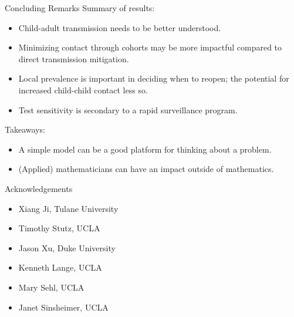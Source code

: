 \documentclass[8pt]{beamer}
\begin{document}
\begin{frame}{Concluding Remarks}
Summary of results:
\begin{itemize}
    \item Child-adult transmission needs to be better understood.
    \item Minimizing contact through cohorts may be more impactful compared to direct transmission mitigation.
    \item Local prevalence is important in deciding when to reopen; the potential for increased child-child contact less so.
    \item Test sensitivity is secondary to a rapid surveillance program.
\end{itemize}

Takeaways:
\begin{itemize}
    \item A simple model can be a good platform for thinking about a problem.
    \item (Applied) mathematicians can have an impact outside of mathematics.
\end{itemize}
\end{frame}

\begin{frame}{Acknowledgements}
\begin{itemize}
    \item Xiang Ji, Tulane University
    \item Timothy Stutz, UCLA
    \item Jason Xu, Duke University
    \item Kenneth Lange, UCLA
    \item Mary Sehl, UCLA
    \item Janet Sinsheimer, UCLA
\end{itemize}
\end{frame}
\end{document}

